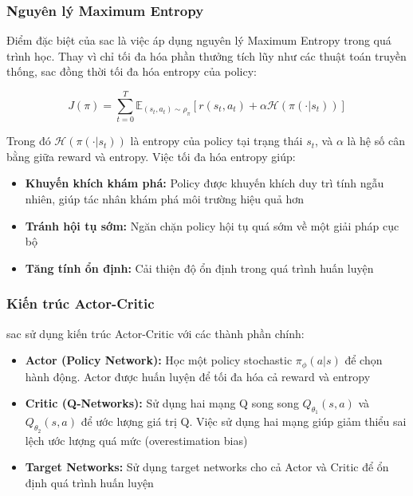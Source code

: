 \subsubsection{Nguyên lý Maximum Entropy}
Điểm đặc biệt của \ac{sac} là việc áp dụng nguyên lý Maximum Entropy trong quá trình học. Thay vì chỉ tối đa hóa phần thưởng tích lũy như các thuật toán truyền thống, \ac{sac} đồng thời tối đa hóa entropy của policy:

\begin{equation}
    J(\pi) = \sum_{t=0}^{T} \mathbb{E}_{(s_t,a_t) \sim \rho_\pi} [r(s_t, a_t) + \alpha \mathcal{H}(\pi(\cdot|s_t))]
\end{equation}

Trong đó $\mathcal{H}(\pi(\cdot|s_t))$ là entropy của policy tại trạng thái $s_t$, và $\alpha$ là hệ số cân bằng giữa reward và entropy. Việc tối đa hóa entropy giúp:
\begin{itemize}
    \item \textbf{Khuyến khích khám phá:} Policy được khuyến khích duy trì tính ngẫu nhiên, giúp tác nhân khám phá môi trường hiệu quả hơn
    \item \textbf{Tránh hội tụ sớm:} Ngăn chặn policy hội tụ quá sớm về một giải pháp cục bộ
    \item \textbf{Tăng tính ổn định:} Cải thiện độ ổn định trong quá trình huấn luyện
\end{itemize}

\subsubsection{Kiến trúc Actor-Critic}
\ac{sac} sử dụng kiến trúc Actor-Critic với các thành phần chính:
\begin{itemize}
    \item \textbf{Actor (Policy Network):} Học một policy stochastic $\pi_\phi(a|s)$ để chọn hành động. Actor được huấn luyện để tối đa hóa cả reward và entropy
    \item \textbf{Critic (Q-Networks):} Sử dụng hai mạng Q song song $Q_{\theta_1}(s,a)$ và $Q_{\theta_2}(s,a)$ để ước lượng giá trị Q. Việc sử dụng hai mạng giúp giảm thiểu sai lệch ước lượng quá mức (overestimation bias)
    \item \textbf{Target Networks:} Sử dụng target networks cho cả Actor và Critic để ổn định quá trình huấn luyện
\end{itemize}

